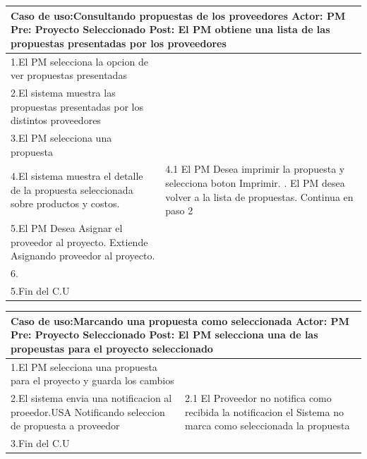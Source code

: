 \begin{longtable}{|p{}|p{}|}
    \hline
    \multicolumn{2}{|p{16cm}|}{
        \textbf{Caso de uso:}Consultando propuestas de los proveedores\newline
        \textbf{Actor:} PM\newline
        \textbf{Pre: }Proyecto Seleccionado\newline
        \textbf{Post:} El PM obtiene una lista de las propuestas presentadas por los proveedores
    }\\
    \hline
    1.El PM selecciona la opcion de ver propuestas presentadas&\\
    \hline
    2.El sistema muestra las propuestas presentadas por los distintos proveedores & \\
    \hline
    3.El PM selecciona una propuesta  &\\
    \hline
    4.El sistema muestra el detalle de la propuesta seleccionada sobre productos y costos.&4.1 El PM Desea imprimir la propuesta y selecciona boton Imprimir. \newline 4.2. El PM desea volver a la lista de propuestas. Continua en paso 2\\
    \hline
    5.El PM Desea Asignar el proveedor al proyecto. Extiende Asignando proveedor al proyecto.&\\
    \hline
    6.&\\
    \hline
    5.Fin del C.U&\\
    \hline
\end{longtable}

\begin{longtable}{|p{}|p{}|}
    \hline
    \multicolumn{2}{|p{16cm}|}{
        \textbf{Caso de uso:}Marcando una propuesta como seleccionada\newline
        \textbf{Actor:} PM\newline
        \textbf{Pre: }Proyecto Seleccionado\newline
        \textbf{Post:} El PM selecciona una de las propeustas para el proyecto seleccionado
    }\\
    \hline
    1.El PM selecciona una propuesta para el proyecto y guarda los cambios&\\
    \hline
    2.El sistema envia una notificacion al proeedor.USA Notificando seleccion de propuesta a proveedor& 2.1 El Proveedor no notifica como recibida la notificacion \newline 2.2 el Sistema no marca como seleccionada la propuesta\\
    \hline
    3.Fin del C.U&\\
    \hline
\end{longtable}

